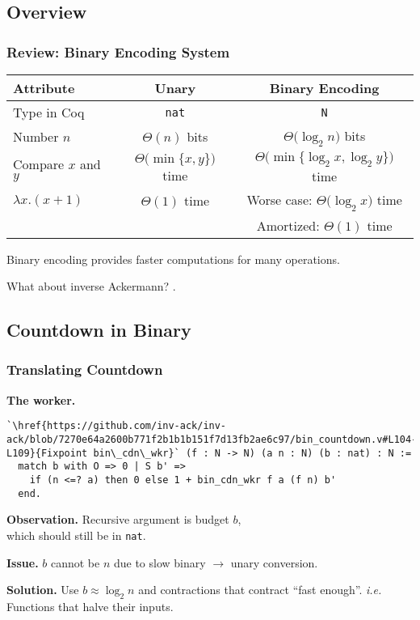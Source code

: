
\subsection{Overview}

\begin{frame}
\frametitle{Review: Binary Encoding System}

\begin{tabular}{l|c|c}
	Attribute & Unary & Binary Encoding \\ \hline
	Type in Coq & \texttt{nat} & \texttt{N} \topspace{1pt} \\[6pt]
	Number $n$ & $\Theta(n)$ bits & $\Theta\big(\log_2n\big)$ bits \\[7pt]
	Compare $x$ and $y$ & $\Theta\big(\min\{x, y\}\big)$ time & $\Theta\big(\min\{ \log_2x, \log_2y\}\big)$ time \\[9pt]
	$\lambda x. (x + 1)$ & $\Theta(1)$ time & Worse case: $\Theta\big(\log_2x\big)$ time \\[1pt]
	                     &             & Amortized: $\Theta(1)$ time \\
	                    
\end{tabular}

\bigskip

Binary encoding provides faster computations for many operations.

\smallskip

\pause 
What about inverse Ackermann? .

\end{frame}


\subsection{Countdown in Binary}


\begin{frame}[fragile]
\frametitle{Translating Countdown}

\textbf{The worker.}
\begin{lstlisting}
`\href{https://github.com/inv-ack/inv-ack/blob/7270e64a2600b771f2b1b1b151f7d13fb2ae6c97/bin_countdown.v#L104-L109}{Fixpoint bin\_cdn\_wkr}` (f : N -> N) (a n : N) (b : nat) : N :=
  match b with O => 0 | S b' =>
    if (n <=? a) then 0 else 1 + bin_cdn_wkr f a (f n) b'
  end.
\end{lstlisting}

\smallskip

\pause 
\textbf{Observation.} Recursive argument is budget $b$, \\which should still be in \texttt{nat}.

\bigskip

\textbf{Issue.} $b$ cannot be $n$ due to slow binary $\rightarrow$ unary conversion.

\bigskip

\pause 
\textbf{Solution.} Use $b \approx \log_2n$ and contractions that contract ``fast enough''. 
\emph{i.e.} Functions that halve their inputs.
\end{frame}



